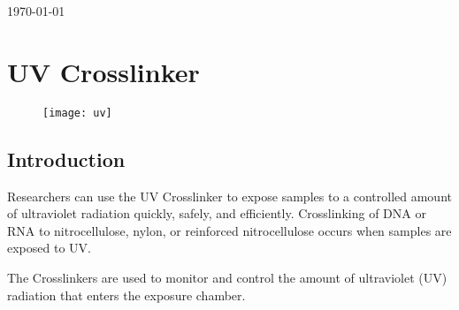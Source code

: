 \documentclass[12pt]{article}
\begin{document}
\begin{titlepage}
	
	
	\vfill\vfill\vfill %
	
	{\large\today} %
	
	
	 
	
	\vfill %
	\date{}
\end{titlepage}
	
\clearpage
\newpage







\section{UV Crosslinker}


\begin{figure}[h]
\centering
\texttt{[image: uv]}

\end{figure}





\subsection{Introduction}

Researchers can use the UV Crosslinker to expose samples to a controlled amount of ultraviolet radiation quickly, safely, and efficiently. Crosslinking of DNA or RNA to nitrocellulose, nylon, or reinforced nitrocellulose occurs when samples are exposed to UV.

The Crosslinkers are used to monitor and control the amount of ultraviolet (UV) radiation that enters the exposure chamber.
\end{document}
